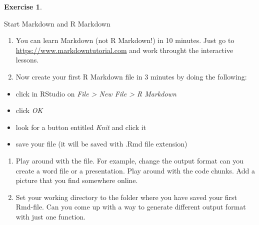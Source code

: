\documentclass[
  12pt,
  oneside]{book}
\providecommand{\tightlist}{%
  \setlength{\itemsep}{0pt}\setlength{\parskip}{0pt}}
\theoremstyle{definition}
\theoremstyle{definition}
\theoremstyle{definition}
\newtheorem{exercise}{Exercise}[chapter]
\theoremstyle{definition}
\theoremstyle{remark}
\begin{document}
\begin{exercise}
\protect\hypertarget{exr:rmdfirst}{}\label{exr:rmdfirst}

Start Markdown and R Markdown

\begin{enumerate}
\def\labelenumi{\alph{enumi})}
\tightlist
\item
  You can learn Markdown (not R Markdown!) in 10 minutes. Just go to \url{https://www.markdowntutorial.com} and work throught the interactive lessons.
\item
  Now create your first R Markdown file in 3 minutes by doing the following:
\end{enumerate}

\begin{itemize}
\tightlist
\item
  click in RStudio on \emph{File \textgreater{} New File \textgreater{} R Markdown}
\item
  click \emph{OK}
\item
  look for a button entitled \emph{Knit} and click it
\item
  save your file (it will be saved with .Rmd file extension)
\end{itemize}

\begin{enumerate}
\def\labelenumi{\alph{enumi})}
\setcounter{enumi}{2}
\tightlist
\item
  Play around with the file. For example, change the output format can you create a word file or a presentation. Play around with the code chunks. Add a picture that you find somewhere online.
\item
  Set your working directory to the folder where you have saved your first Rmd-file. Can you come up with a way to generate different output format with just one function.
\end{enumerate}

\end{exercise}
\end{document}
